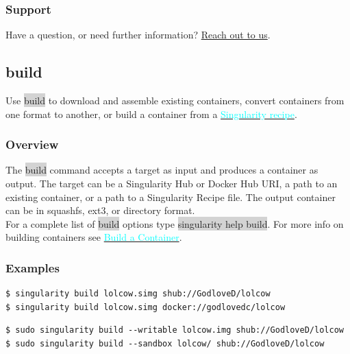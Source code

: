 \documentclass[a4paper]{article}
\newcounter{subsubsubsection}[subsubsection]
\begin{document}
\subsubsection{Support}

Have a question, or need further information? \href{http://singularity.lbl.gov/support}{Reach out to us}.

\subsection{build}
\label{sec:build}

Use \colorbox{lightgray}{build} to download and assemble existing containers, convert containers from one format to another, or build a container from a \hyperref[sec:recipefile]{{\textcolor{cyan}{Singularity recipe}}}. 

\subsubsection{Overview}

The \colorbox{lightgray}{build} command accepts a target as input and produces a container as output. The target can be a Singularity Hub or Docker Hub URI, a path to an existing container, or a path to a Singularity Recipe file. The output container can be in squashfs, ext3, or directory format.\\[0.1in]

For a complete list of \colorbox{lightgray}{build} options type \colorbox{lightgray}{singularity help build}. For more info on building containers see \hyperref[sec:buildcontainer]{{\textcolor{cyan}{Build a Container}}}.

\subsubsection{Examples}
\begin{lstlisting}[frame=single]
$ singularity build lolcow.simg shub://GodloveD/lolcow
$ singularity build lolcow.simg docker://godlovedc/lolcow
\end{lstlisting}	
\begin{lstlisting}[frame=single]
$ sudo singularity build --writable lolcow.img shub://GodloveD/lolcow
$ sudo singularity build --sandbox lolcow/ shub://GodloveD/lolcow
\end{lstlisting}
	
\end{document}
